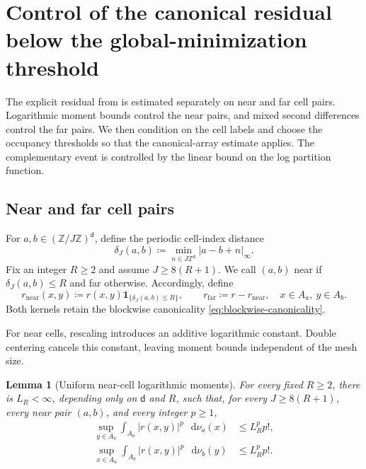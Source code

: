 \documentclass[11pt,reqno]{amsart}
\numberwithin{equation}{section}
\theoremstyle{plain}
\newtheorem{lemma}[lemma]{Lemma}
\theoremstyle{definition}
\renewcommand{\d}{\mathsf d}
\newcommand{\dd}{\mathop{}\!\mathrm d}
\newcommand{\Z}{\mathbb Z}
\newcommand{\one}{\mathbf 1}
\begin{document}
\section{Control of the canonical residual below the global-minimization threshold}
\label{sec:canonical-residual}

The explicit residual from  is estimated separately on near and far cell pairs. Logarithmic moment bounds control the near pairs, and mixed second differences control the far pairs. We then condition on the cell labels and choose the occupancy thresholds so that the canonical-array estimate applies. The complementary event is controlled by the linear bound on the log partition function.

\subsection{Near and far cell pairs}
\label{subsec:near-far-cell-pairs}

For $a,b\in(\Z/J\Z)^{\d}$, define the periodic cell-index distance
\begin{equation}
 \delta_J(a,b)\coloneqq\min_{n\in J\Z^{\d}}|a-b+n|_{\infty}.
 \label{eq:cell-index-distance}
\end{equation}
Fix an integer $R\geq2$ and assume $J\geq8(R+1)$.  We call $(a,b)$ near if $\delta_J(a,b)\leq R$ and far otherwise.  Accordingly, define
\begin{equation}
 r_{\mathrm{near}}(x,y)
 \coloneqq r(x,y)\one_{\{\delta_J(a,b)\leq R\}},
 \qquad
 r_{\mathrm{far}}\coloneqq r-r_{\mathrm{near}},
 \quad x\in A_a,\ y\in A_b.
 \label{eq:near-far-kernels}
\end{equation}
Both kernels retain the blockwise canonicality \eqref{eq:blockwise-canonicality}.

For near cells, rescaling introduces an additive logarithmic constant. Double centering cancels this constant, leaving moment bounds independent of the mesh size.

\begin{lemma}[Uniform near-cell logarithmic moments]
\label{lem:near-cell-logarithmic-moments}
For every fixed $R\geq2$, there is $L_R<\infty$, depending only on $\d$ and $R$, such that, for every $J\geq8(R+1)$, every near pair $(a,b)$, and every integer $p\geq1$,
\begin{align}
 \sup_{y\in A_b}\int_{A_a}|r(x,y)|^p\,\dd\nu_a(x)
 &\leq L_R^p p!,
 \label{eq:near-moment-first}\\
 \sup_{x\in A_a}\int_{A_b}|r(x,y)|^p\,\dd\nu_b(y)
 &\leq L_R^p p!.
 \label{eq:near-moment-second}
\end{align}
\end{lemma}
\end{document}
